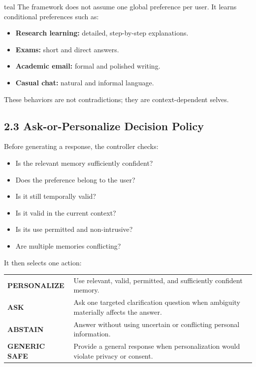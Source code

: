 \documentclass[10pt,a4paper]{article}
\begin{document}
\begin{keybox}[title={One User, Many Selves}]{teal}
The framework does not assume one global preference per user. It learns conditional preferences such as:
\begin{itemize}
  \item \textbf{Research learning:} detailed, step-by-step explanations.
  \item \textbf{Exams:} short and direct answers.
  \item \textbf{Academic email:} formal and polished writing.
  \item \textbf{Casual chat:} natural and informal language.
\end{itemize}
These behaviors are not contradictions; they are context-dependent selves.
\end{keybox}

\subsection{2.3 Ask-or-Personalize Decision Policy}

Before generating a response, the controller checks:

\begin{itemize}
  \item Is the relevant memory sufficiently confident?
  \item Does the preference belong to the user?
  \item Is it still temporally valid?
  \item Is it valid in the current context?
  \item Is its use permitted and non-intrusive?
  \item Are multiple memories conflicting?
\end{itemize}

It then selects one action:

\begin{tabularx}{\textwidth}{>{\bfseries}p{2.8cm} X}
\rowcolor{lightblue} PERSONALIZE & Use relevant, valid, permitted, and sufficiently confident memory. \\
\rowcolor{lightorange} ASK & Ask one targeted clarification question when ambiguity materially affects the answer. \\
\rowcolor{lightpurple} ABSTAIN & Answer without using uncertain or conflicting personal information. \\
\rowcolor{lightteal} GENERIC SAFE & Provide a general response when personalization would violate privacy or consent. \\
\end{tabularx}
\end{document}
